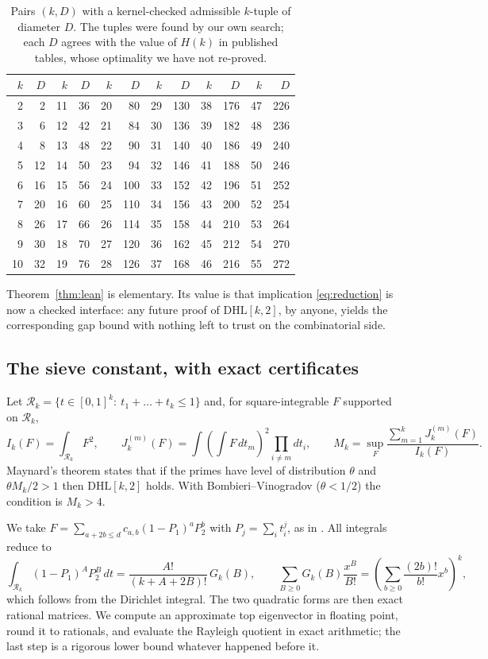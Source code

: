 \documentclass[11pt]{amsart}
\theoremstyle{definition}
\theoremstyle{remark}
\newcommand{\DHL}{\mathrm{DHL}}
\newcommand{\R}{\mathcal{R}}
\begin{document}
\begin{table}[h]
\caption{Pairs $(k,D)$ with a kernel-checked admissible $k$-tuple of diameter
$D$. The tuples were found by our own search; each $D$ agrees with the value
of $H(k)$ in published tables, whose optimality we have not re-proved.}
\label{tab:tuples}
\begin{tabular}{@{}rr@{\qquad}rr@{\qquad}rr@{\qquad}rr@{\qquad}rr@{\qquad}rr@{}}
\toprule
$k$&$D$&$k$&$D$&$k$&$D$&$k$&$D$&$k$&$D$&$k$&$D$\\
\midrule
2&2&11&36&20&80&29&130&38&176&47&226\\
3&6&12&42&21&84&30&136&39&182&48&236\\
4&8&13&48&22&90&31&140&40&186&49&240\\
5&12&14&50&23&94&32&146&41&188&50&246\\
6&16&15&56&24&100&33&152&42&196&51&252\\
7&20&16&60&25&110&34&156&43&200&52&254\\
8&26&17&66&26&114&35&158&44&210&53&264\\
9&30&18&70&27&120&36&162&45&212&54&270\\
10&32&19&76&28&126&37&168&46&216&55&272\\
\bottomrule
\end{tabular}
\end{table}

Theorem~\ref{thm:lean} is elementary. Its value is that implication
\eqref{eq:reduction} is now a checked interface: any future proof of
$\DHL[k,2]$, by anyone, yields the corresponding gap bound with nothing left
to trust on the combinatorial side.

\subsection{The sieve constant, with exact certificates}

Let $\R_k=\{t\in[0,1]^k:\ t_1+\dots+t_k\le1\}$ and, for square-integrable $F$
supported on $\R_k$,
\[
I_k(F)=\int_{\R_k}F^2,\qquad
J_k^{(m)}(F)=\int\left(\int F\,dt_m\right)^{2}\prod_{i\ne m}dt_i,\qquad
M_k=\sup_F\frac{\sum_{m=1}^{k}J_k^{(m)}(F)}{I_k(F)}.
\]
Maynard's theorem \cite[Prop.~4.2]{May15} states that if the primes have level
of distribution $\theta$ and $\theta M_k/2>1$ then $\DHL[k,2]$ holds. With
Bombieri--Vinogradov ($\theta<1/2$) the condition is $M_k>4$.

We take $F=\sum_{a+2b\le d}c_{a,b}(1-P_1)^aP_2^b$ with $P_j=\sum_it_i^j$, as
in \cite[\S8]{May15}. All integrals reduce to
\[
\int_{\R_k}(1-P_1)^AP_2^B\,dt=\frac{A!}{(k+A+2B)!}\,G_k(B),\qquad
\sum_{B\ge0}G_k(B)\frac{x^B}{B!}=\left(\sum_{b\ge0}\frac{(2b)!}{b!}x^b\right)^{k},
\]
which follows from the Dirichlet integral. The two quadratic forms are then
exact rational matrices. We compute an approximate top eigenvector in
floating point, round it to rationals, and evaluate the Rayleigh quotient in
exact arithmetic; the last step is a rigorous lower bound whatever happened
before it.
\end{document}
